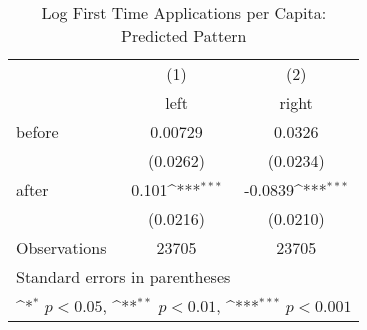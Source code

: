 \begin{table}[htbp]\centering
\def\sym#1{\ifmmode^{#1}\else\(^{#1}\)\fi}
\caption{Log First Time Applications per Capita: Predicted Pattern}
\begin{tabular}{l*{2}{c}}
\hline\hline
                    &\multicolumn{1}{c}{(1)}&\multicolumn{1}{c}{(2)}\\
                    &\multicolumn{1}{c}{left}&\multicolumn{1}{c}{right}\\
\hline
before              &     0.00729         &      0.0326         \\
                    &    (0.0262)         &    (0.0234)         \\
[1em]
after               &       0.101\sym{***}&     -0.0839\sym{***}\\
                    &    (0.0216)         &    (0.0210)         \\
\hline
Observations        &       23705         &       23705         \\
\hline\hline
\multicolumn{3}{l}{\footnotesize Standard errors in parentheses}\\
\multicolumn{3}{l}{\footnotesize \sym{*} \(p<0.05\), \sym{**} \(p<0.01\), \sym{***} \(p<0.001\)}\\
\end{tabular}
\end{table}
